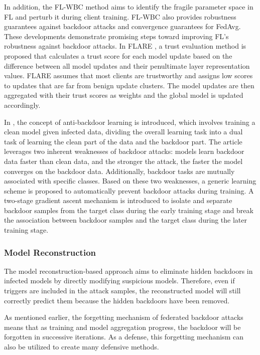 \documentclass[conference]{IEEEtran}
\begin{document}
In addition, the FL-WBC \cite{b88} method aims to identify the fragile parameter space in FL and perturb it
during client training. FL-WBC also provides robustness guarantees against backdoor attacks and convergence guarantees for FedAvg.
These developments demonstrate promising steps toward improving FL's robustness against backdoor attacks. In FLARE \cite{b89}, a trust
evaluation method is proposed that calculates a trust score for each model update based on the difference between all model updates and
their penultimate layer representation values. FLARE assumes that most clients are trustworthy and assigns low scores
to updates that are far from benign update clusters. The model updates are then aggregated with their trust scores as
weights and the global model is updated accordingly.

In \cite{b98}, the concept of anti-backdoor learning is introduced, which involves training a clean model given infected data,
dividing the overall learning task into a dual task of learning the clean part of the data and the backdoor part.
The article leverages two inherent weaknesses of backdoor attacks: models learn backdoor data faster than clean data,
and the stronger the attack, the faster the model converges on the backdoor data. Additionally, backdoor tasks are mutually
associated with specific classes. Based on these two weaknesses, a generic learning scheme is proposed to automatically prevent
backdoor attacks during training. A two-stage gradient ascent mechanism is introduced to isolate and separate backdoor samples
from the target class during the early training stage and break the association between backdoor samples and the target class during the later training stage.
\subsubsection{Model Reconstruction}
The model reconstruction-based approach aims to eliminate hidden backdoors in infected models by directly modifying suspicious models.
Therefore, even if triggers are included in the attack samples, the reconstructed model will still correctly predict them because
the hidden backdoors have been removed.

As mentioned earlier, the forgetting mechanism of federated backdoor attacks means that as training and model aggregation progress,
the backdoor will be forgotten in successive iterations. As a defense, this forgetting mechanism can also be utilized to create many defensive methods.
\end{document}
